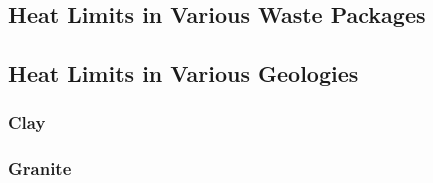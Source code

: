 \subsection{Heat Limits in Various Waste Packages} 




\subsection{Heat Limits in Various Geologies}

\subsubsection{Clay} 
% 

\subsubsection{Granite}

